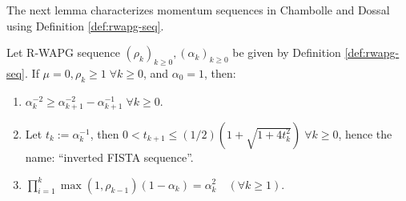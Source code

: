 \documentclass[12pt]{article}
\begin{document}
    The next lemma characterizes momentum sequences in Chambolle and Dossal \cite{chambolle_convergence_2015} using Definition \ref{def:rwapg-seq}.
    \begin{lemma}\label{lemma:inverted-fista-seq}
        Let R-WAPG sequence $(\rho_k)_{k \ge 0}, (\alpha_k)_{k \ge 0}$ be given by Definition \ref{def:rwapg-seq}.
        If $\mu = 0, \rho_k \ge 1\; \forall k \ge 0$, and $\alpha_0 = 1$, then:
        \begin{enumerate}
            \item $\alpha_k^{-2} \ge \alpha_{k + 1}^{-2} - \alpha_{k + 1}^{-1}\; \forall k \ge 0$.
            \item Let $t_k := \alpha_k^{-1}$, then $0 < t_{k + 1} \le (1/2)\left(1 + \sqrt{1 + 4t_k^2}\right)\;\forall k\ge 0$, hence the name: ``inverted FISTA sequence''.
            \item $\prod_{i = 1}^k\max(1, \rho_{k - 1})(1 - \alpha_k) = \alpha_k^2 \quad (\forall k \ge 1)$.
        \end{enumerate}
    \end{lemma}
\end{document}
